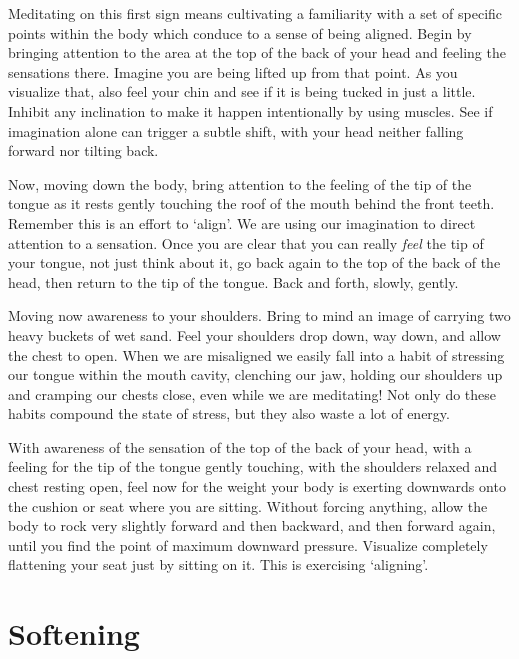 Meditating on this first sign means cultivating a familiarity with a set
of specific points within the body which conduce to a sense of being
aligned. Begin by bringing attention to the area at the top of the back
of your head and feeling the sensations there. Imagine you are being
lifted up from that point. As you visualize that, also feel your chin
and see if it is being tucked in just a little. Inhibit any inclination
to make it happen intentionally by using muscles. See if imagination
alone can trigger a subtle shift, with your head neither falling forward
nor tilting back.

Now, moving down the body, bring attention to the feeling of the tip of
the tongue as it rests gently touching the roof of the mouth behind the
front teeth. Remember this is an effort to ‘align’. We are using our
imagination to direct attention to a sensation. Once you are clear that
you can really \emph{feel} the tip of your tongue, not just think about it,
go back again to the top of the back of the head, then return to the tip
of the tongue. Back and forth, slowly, gently.

Moving now awareness to your shoulders. Bring to mind an image of
carrying two heavy buckets of wet sand. Feel your shoulders drop down,
way down, and allow the chest to open. When we are misaligned we easily
fall into a habit of stressing our tongue within the mouth cavity,
clenching our jaw, holding our shoulders up and cramping our chests
close, even while we are meditating! Not only do these habits compound
the state of stress, but they also waste a lot of energy.

With awareness of the sensation of the top of the back of your head,
with a feeling for the tip of the tongue gently touching, with the
shoulders relaxed and chest resting open, feel now for the weight your
body is exerting downwards onto the cushion or seat where you are
sitting. Without forcing anything, allow the body to rock very slightly
forward and then backward, and then forward again, until you find the
point of maximum downward pressure. Visualize completely flattening your
seat just by sitting on it. This is exercising ‘aligning’.

\section{Softening}

